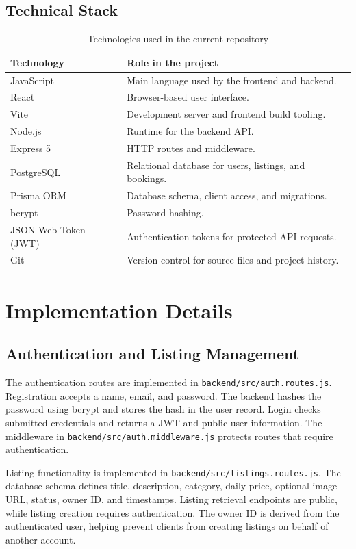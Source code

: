 \documentclass{tietreport}
\begin{document}
\subsection{Technical Stack}
\begin{table}[H]
\centering
\caption{Technologies used in the current repository}
\begin{tabular}{p{} p{}}
\toprule
\textbf{Technology} & \textbf{Role in the project}\\
\midrule
JavaScript & Main language used by the frontend and backend.\\
React & Browser-based user interface.\\
Vite & Development server and frontend build tooling.\\
Node.js & Runtime for the backend API.\\
Express 5 & HTTP routes and middleware.\\
PostgreSQL & Relational database for users, listings, and bookings.\\
Prisma ORM & Database schema, client access, and migrations.\\
bcrypt & Password hashing.\\
JSON Web Token (JWT) & Authentication tokens for protected API requests.\\
Git & Version control for source files and project history.\\
\bottomrule
\end{tabular}
\end{table}

\section{Implementation Details}
\subsection{Authentication and Listing Management}
The authentication routes are implemented in \texttt{backend/src/auth.routes.js}. Registration accepts a name, email, and password. The backend hashes the password using bcrypt and stores the hash in the user record. Login checks submitted credentials and returns a JWT and public user information. The middleware in \texttt{backend/src/auth.middleware.js} protects routes that require authentication.

Listing functionality is implemented in \texttt{backend/src/listings.routes.js}. The database schema defines title, description, category, daily price, optional image URL, status, owner ID, and timestamps. Listing retrieval endpoints are public, while listing creation requires authentication. The owner ID is derived from the authenticated user, helping prevent clients from creating listings on behalf of another account.
\end{document}
